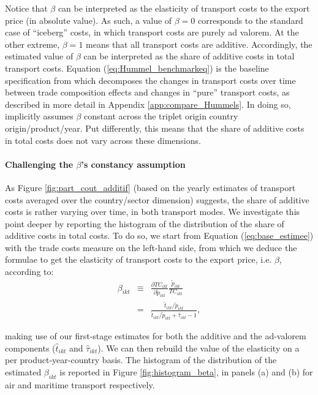 \documentclass[a4paper,11pt]{article}
\begin{document}
Notice that $\beta$ can be interpreted as the elasticity of transport costs to the export price (in absolute value).
As such, a value of $\beta = 0$ corresponds to the standard case of ``iceberg'' costs, in which transport costs are purely ad valorem.
At the other extreme, $\beta = 1$ means that all transport costs are additive.
Accordingly, the estimated value of $\beta$ can be interpreted as the share of additive costs in total transport costs.
Equation (\ref{eq:Hummel_benchmarkeq}) is the baseline specification from which \cite{hummels2007} decomposes the changes in transport costs over time between trade composition effects and changes in ``pure'' transport costs, as described in more detail in Appendix \ref{app:compare_Hummels}.
In doing so, \cite{hummels2007} implicitly assumes $\beta$ constant across the triplet origin country origin/product/year.
Put differently, this means that the share of additive costs in total costs does not vary across these dimensions.

\paragraph{Challenging the $\beta$'s constancy assumption} As Figure \ref{fig:part_cout_additif} (based on the yearly estimates of transport costs averaged over the country/sector dimension) suggests, the share of additive costs is rather varying over time, in both transport modes.
We investigate this point deeper by reporting the histogram of the distribution of the share of additive costs in total costs.
To do so, we start from Equation (\ref{eq:base_estimee}) with the trade costs measure on the left-hand side, from which we deduce the formulae to get the elasticity of transport costs to the export price, i.e.
$\beta$, according to:
\begin{eqnarray*}
\beta_{ikt} &\equiv& \frac{\partial TC_{ikt}}{\partial \widetilde{p}_{ikt}}\frac{\widetilde{p}_{ikt}}{TC_{ikt}} \\
&=& \frac{\widehat{t}_{ikt}/\widetilde{p}_{ikt}}{\widehat{t}_{ikt}/\widetilde{p}_{ikt}+\widehat{\tau}_{ikt}-1},
\end{eqnarray*}

\noindent making use of our first-stage estimates for both the additive and the ad-valorem components ($\widehat{t}_{ikt}$ and $\widehat{\tau}_{ikt}$).
We can then rebuild the value of the elasticity on a per product-year-country basis.
The histogram of the distribution of the estimated $\beta_{ikt}$ is reported in Figure \ref{fig:histogram_beta}, in panels (a) and (b) for air and maritime transport respectively.
\end{document}
